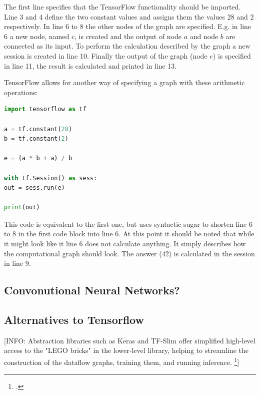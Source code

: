 The first line specifies that the TensorFlow functionality should be imported. Line 3 and 4 define the two constant values and assigns them the values 28 and 2 respectively. In line 6 to 8 the other nodes of the graph are specified. E.g. in line 6 a new node, named $c$, is created and the output of node $a$ and node $b$ are connected as its input. To perform the calculation described by the graph a new session is created in line 10. Finally the output of the graph (node $e$) is specified in line 11, the result is calculated and printed in line 13.

TensorFlow allows for another way of specifying a graph with these arithmetic operations:

\begin{lstlisting}[language=python]
import tensorflow as tf

a = tf.constant(28)
b = tf.constant(2)

e = (a * b + a) / b

with tf.Session() as sess:
out = sess.run(e)

print(out)
\end{lstlisting}

This code is equivalent to the first one, but uses syntactic sugar to shorten line 6 to 8 in the first code block into line 6. At this point it should be noted that while it might look like it line 6 does not calculate anything. It simply describes how the computational graph should look. The answer (42) is calculated in the session in line 9.

\subsection{Convonutional Neural Networks?}

\subsection{Alternatives to Tensorflow}
[INFO: Abstraction libraries such as Keras and TF-Slim offer simplified  high-level  access  to  the  "LEGO  bricks"  in  the  lower-level  library,  helping  to streamline the construction of the dataflow graphs, training them, and running inference. \footcite[page 7]{Hope_Learning_TensorFlow}]

